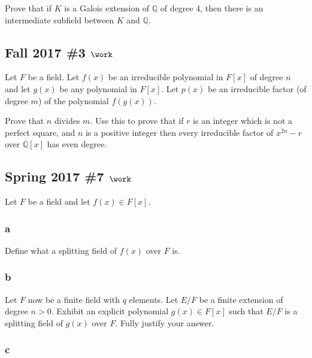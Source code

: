 Prove that if \(K\) is a Galois extension of \({\mathbb{Q}}\) of degree
4, then there is an intermediate subfield between \(K\) and
\({\mathbb{Q}}\).

\hypertarget{fall-2017-3-work}{%
\subsection{\texorpdfstring{Fall 2017 \#3
\(\work\)}{Fall 2017 \#3 \textbackslash work}}\label{fall-2017-3-work}}

Let \(F\) be a field. Let \(f(x)\) be an irreducible polynomial in
\(F[x]\) of degree \(n\) and let \(g(x)\) be any polynomial in \(F[x]\).
Let \(p(x)\) be an irreducible factor (of degree \(m\)) of the
polynomial \(f(g(x))\).

Prove that \(n\) divides \(m\). Use this to prove that if \(r\) is an
integer which is not a perfect square, and \(n\) is a positive integer
then every irreducible factor of \(x^{2n} - r\) over \({\mathbb{Q}}[x]\)
has even degree.

\hypertarget{spring-2017-7-work}{%
\subsection{\texorpdfstring{Spring 2017 \#7
\(\work\)}{Spring 2017 \#7 \textbackslash work}}\label{spring-2017-7-work}}

Let \(F\) be a field and let \(f(x) \in F[x]\).

\hypertarget{a-66}{%
\subsubsection{a}\label{a-66}}

Define what a splitting field of \(f(x)\) over \(F\) is.

\hypertarget{b-56}{%
\subsubsection{b}\label{b-56}}

Let \(F\) now be a finite field with \(q\) elements. Let \(E/F\) be a
finite extension of degree \(n>0\). Exhibit an explicit polynomial
\(g(x) \in F[x]\) such that \(E/F\) is a splitting field of \(g(x)\)
over \(F\). Fully justify your answer.

\hypertarget{c-38}{%
\subsubsection{c}\label{c-38}}

